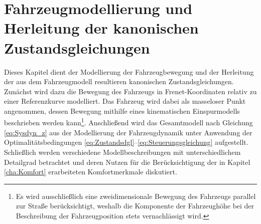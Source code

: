 \chapter{Fahrzeugmodellierung und Herleitung der kanonischen Zustandsgleichungen}\label{cha:Modellbildung}
Dieses Kapitel dient der Modellierung der Fahrzeugbewegung und der Herleitung der aus dem Fahrzeugmodell resultieren kanonischen Zustandsgleichungen. Zunächst wird dazu die Bewegung des Fahrzeugs in Frenet-Koordinaten relativ zu einer Referenzkurve modelliert. Das Fahrzeug wird dabei als masseloser Punkt angenommen, dessen Bewegung mithilfe eines kinematischen Einspurmodells beschrieben werden kann\footnote{Es wird ausschließlich eine zweidimensionale Bewegung des Fahrzeugs parallel zur Straße berücksichtigt, weshalb die Komponente der Fahrzeughöhe bei der Beschreibung der Fahrzeugposition stets vernachlässigt wird.}. Anschließend wird das Gesamtmodell nach Gleichung \eqref{eq:Sysdyn_z} aus der Modellierung der Fahrzeugdynamik unter Anwendung der Optimalitätsbedingungen \eqref{eq:Zustandsdgl}--\eqref{eq:Steuerungsgleichung} aufgestellt. Schließlich werden verschiedene Modellbeschreibungen mit unterschiedlichem Detailgrad betrachtet und deren Nutzen für die Berücksichtigung der in Kapitel \ref{cha:Komfort} erarbeiteten Komfortmerkmale diskutiert. 
